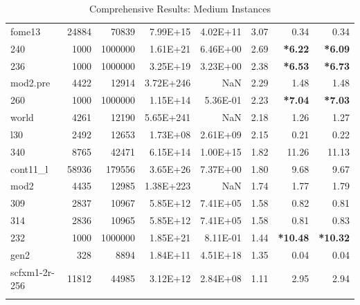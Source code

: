 \documentclass[10pt]{article}
\newcommand{\red}{
	\color{red}	
	}
\begin{document}
\begin{longtable}{|l|r|r|r|r|r|r|r|}
fome13	&	24884	&	70839	&	7.99E+15	&	4.02E+11	&	3.07	&	0.34	&	0.34	\\
240	&	1000	&	1000000	&	1.61E+21	&	6.46E+00	&	2.69	&	{\bf \red *6.22}	&	{\bf \red *6.09}	\\
236	&	1000	&	1000000	&	3.25E+19	&	3.23E+00	&	2.38	&	{\bf \red *6.53}	&	{\bf \red *6.73}	\\
mod2.pre	&	4422	&	12914	&	3.72E+246	&	NaN	&	2.29	&	1.48	&	1.48	\\
260	&	1000	&	1000000	&	1.15E+14	&	5.36E-01	&	2.23	&	{\bf \red *7.04}	&	{\bf \red *7.03} 	\\
world	&	4261	&	12190	&	5.65E+241	&	NaN	&	2.18	&	1.26	&	1.27	\\
l30	&	2492	&	12653	&	1.73E+08	&	2.61E+09	&	2.15	&	0.21	&	0.22	\\
340	&	8765	&	42471	&	6.15E+14	&	1.00E+15	&	1.82	&	11.26	&	11.13	\\
cont11\_l	&	58936	&	179556	&	3.65E+26	&	7.37E+00	&	1.80	&	9.68	&	9.67	\\
mod2	&	4435	&	12985	&	1.38E+223	&	NaN	&	1.74	&	1.77	&	1.79	\\
309	&	2837	&	10967	&	5.85E+12	&	7.41E+05	&	1.58	&	0.82	&	0.81	\\
314	&	2836	&	10965	&	5.85E+12	&	7.41E+05	&	1.58	&	0.81	&	0.83	\\
232	&	1000	&	1000000	&	1.85E+21	&	8.11E-01	&	1.44	&	{\bf \red *10.48} 	&	{\bf \red *10.32} 	\\
gen2	&	328	&	8894	&	1.84E+11	&	4.51E+18	&	1.35	&	0.04	&	0.04	\\
scfxm1-2r-256	&	11812	&	44985	&	3.12E+12	&	2.84E+08	&	1.11	&	2.95	&	2.94	\\
\hline
\caption{Comprehensive Results: Medium Instances}
\small
\centering
\label{supptab:all_medium}
\end{longtable}
\end{document}
